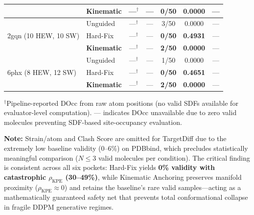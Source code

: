 \documentclass{article}
\begin{document}
\begin{table}[H]
\begin{tabular}{l l c c c c c}
      & \textbf{Kinematic} & ---$^\dagger$ & --- & \textbf{0/50} & \textbf{0.0000} & --- \\
    \midrule
    \multirow{3}{*}{2gqn (10 HEW, 10 SW)}
      & Unguided    & ---$^\dagger$ & --- & 3/50 & 0.0000 & --- \\
      & Hard-Fix    & ---$^\dagger$ & --- & \textbf{0/50} & \textbf{0.4931} & --- \\
      & \textbf{Kinematic} & ---$^\dagger$ & --- & \textbf{2/50} & \textbf{0.0000} & --- \\
    \midrule
    \multirow{3}{*}{6phx (8 HEW, 12 SW)}
      & Unguided    & ---$^\dagger$ & --- & 1/50 & 0.0000 & --- \\
      & Hard-Fix    & ---$^\dagger$ & --- & \textbf{0/50} & \textbf{0.4651} & --- \\
      & \textbf{Kinematic} & ---$^\dagger$ & --- & \textbf{2/50} & \textbf{0.0000} & --- \\
    \bottomrule
  \end{tabular}

  \vspace{4pt}
  \footnotesize
  $^\dagger$Pipeline-reported DOcc from raw atom positions (no valid SDFs
  available for evaluator-level computation).  --- indicates DOcc unavailable
  due to zero valid molecules preventing SDF-based site-occupancy evaluation.

  \textbf{Note:} Strain/atom and Clash Score are omitted for TargetDiff due
  to the extremely low baseline validity (0--6\%) on PDBbind, which
  precludes statistically meaningful comparison ($N \le 3$ valid molecules
  per condition).  The critical finding is consistent across all six pockets:
  Hard-Fix yields \textbf{0\% validity with catastrophic $\rho_{\text{KPE}}$
  (30--49\%)}, while Kinematic Anchoring preserves manifold proximity
  ($\rho_{\text{KPE}} \approx 0$) and retains the baseline's rare valid
  samples---acting as a mathematically guaranteed safety net that prevents
  total conformational collapse in fragile DDPM generative regimes.
\end{table}
\end{document}
